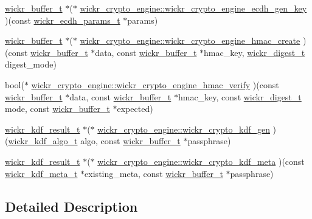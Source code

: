 \begin{DoxyCompactItemize}
\item 
\hyperlink{structwickr__buffer}{wickr\+\_\+buffer\+\_\+t} $\ast$($\ast$ \hyperlink{group__wickr__crypto__engine_ga94bdc8d3b88ac04b9defe663afa48e78}{wickr\+\_\+crypto\+\_\+engine\+::wickr\+\_\+crypto\+\_\+engine\+\_\+ecdh\+\_\+gen\+\_\+key} )(const \hyperlink{structwickr__ecdh__params}{wickr\+\_\+ecdh\+\_\+params\+\_\+t} $\ast$params)
\item 
\hyperlink{structwickr__buffer}{wickr\+\_\+buffer\+\_\+t} $\ast$($\ast$ \hyperlink{group__wickr__crypto__engine_ga782e0e8786ecf8a55c8ae2aea2f178aa}{wickr\+\_\+crypto\+\_\+engine\+::wickr\+\_\+crypto\+\_\+engine\+\_\+hmac\+\_\+create} )(const \hyperlink{structwickr__buffer}{wickr\+\_\+buffer\+\_\+t} $\ast$data, const \hyperlink{structwickr__buffer}{wickr\+\_\+buffer\+\_\+t} $\ast$hmac\+\_\+key, \hyperlink{structwickr__digest}{wickr\+\_\+digest\+\_\+t} digest\+\_\+mode)
\item 
bool($\ast$ \hyperlink{group__wickr__crypto__engine_ga00c52a816403192af5b21d952265d0b6}{wickr\+\_\+crypto\+\_\+engine\+::wickr\+\_\+crypto\+\_\+engine\+\_\+hmac\+\_\+verify} )(const \hyperlink{structwickr__buffer}{wickr\+\_\+buffer\+\_\+t} $\ast$data, const \hyperlink{structwickr__buffer}{wickr\+\_\+buffer\+\_\+t} $\ast$hmac\+\_\+key, const \hyperlink{structwickr__digest}{wickr\+\_\+digest\+\_\+t} mode, const \hyperlink{structwickr__buffer}{wickr\+\_\+buffer\+\_\+t} $\ast$expected)
\item 
\hyperlink{structwickr__kdf__result}{wickr\+\_\+kdf\+\_\+result\+\_\+t} $\ast$($\ast$ \hyperlink{group__wickr__crypto__engine_ga5ab29968c993423df83c9f1a3d7e685d}{wickr\+\_\+crypto\+\_\+engine\+::wickr\+\_\+crypto\+\_\+kdf\+\_\+gen} )(\hyperlink{structwickr__kdf__algo}{wickr\+\_\+kdf\+\_\+algo\+\_\+t} algo, const \hyperlink{structwickr__buffer}{wickr\+\_\+buffer\+\_\+t} $\ast$passphrase)
\item 
\hyperlink{structwickr__kdf__result}{wickr\+\_\+kdf\+\_\+result\+\_\+t} $\ast$($\ast$ \hyperlink{group__wickr__crypto__engine_ga640cbc86ca36c4deb2c197de89dce7d1}{wickr\+\_\+crypto\+\_\+engine\+::wickr\+\_\+crypto\+\_\+kdf\+\_\+meta} )(const \hyperlink{structwickr__kdf__meta}{wickr\+\_\+kdf\+\_\+meta\+\_\+t} $\ast$existing\+\_\+meta, const \hyperlink{structwickr__buffer}{wickr\+\_\+buffer\+\_\+t} $\ast$passphrase)
\end{DoxyCompactItemize}


\subsection{Detailed Description}


